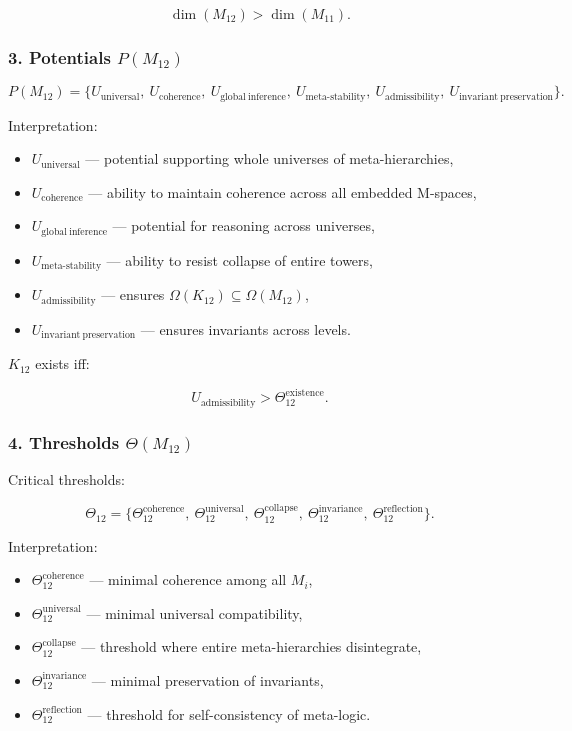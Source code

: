 \[
\dim(M_{12}) > \dim(M_{11}).
\]

\subsubsection*{3. Potentials $P(M_{12})$}

\[
P(M_{12}) =
\{
U_{\mathrm{universal}},\
U_{\mathrm{coherence}},\
U_{\mathrm{global\ inference}},\
U_{\mathrm{meta\mbox{-}stability}},\
U_{\mathrm{admissibility}},\
U_{\mathrm{invariant\ preservation}}
\}.
\]

Interpretation:

\begin{itemize}
    \item $U_{\mathrm{universal}}$ — potential supporting whole universes of meta-hierarchies,
    \item $U_{\mathrm{coherence}}$ — ability to maintain coherence across all embedded M-spaces,
    \item $U_{\mathrm{global\ inference}}$ — potential for reasoning across universes,
    \item $U_{\mathrm{meta\mbox{-}stability}}$ — ability to resist collapse of entire towers,
    \item $U_{\mathrm{admissibility}}$ — ensures $\Omega(K_{12})\subseteq\Omega(M_{12})$,
    \item $U_{\mathrm{invariant\ preservation}}$ — ensures invariants across levels.
\end{itemize}

$K_{12}$ exists iff:

\[
U_{\mathrm{admissibility}} > \Theta_{12}^{\mathrm{existence}}.
\]

\subsubsection*{4. Thresholds $\Theta(M_{12})$}

Critical thresholds:

\[
\Theta_{12}=
\{
\Theta_{12}^{\mathrm{coherence}},\
\Theta_{12}^{\mathrm{universal}},\
\Theta_{12}^{\mathrm{collapse}},\
\Theta_{12}^{\mathrm{invariance}},\
\Theta_{12}^{\mathrm{reflection}}
\}.
\]

Interpretation:

\begin{itemize}
    \item $\Theta_{12}^{\mathrm{coherence}}$ — minimal coherence among all $M_i$,
    \item $\Theta_{12}^{\mathrm{universal}}$ — minimal universal compatibility,
    \item $\Theta_{12}^{\mathrm{collapse}}$ — threshold where entire meta-hierarchies disintegrate,
    \item $\Theta_{12}^{\mathrm{invariance}}$ — minimal preservation of invariants,
    \item $\Theta_{12}^{\mathrm{reflection}}$ — threshold for self-consistency of meta-logic.
\end{itemize}

